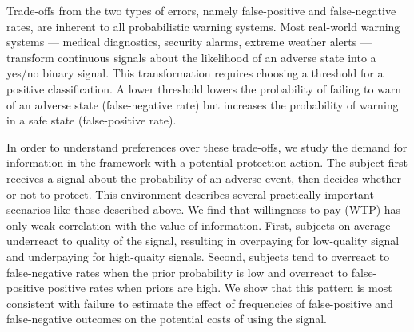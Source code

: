 \documentclass[12pt,a4paper]{article}
\begin{document}
Trade-offs from the two types of errors, namely false-positive and false-negative rates, are inherent to all probabilistic warning systems.  Most real-world warning systems --- medical diagnostics, security alarms, extreme weather alerts --- transform continuous signals about the likelihood of an adverse state into a yes/no binary signal. This transformation requires choosing a threshold for a positive classification. A lower threshold lowers the probability of failing to warn of an adverse state (false-negative rate) but increases the probability of warning in a safe state (false-positive rate). 

In order to understand preferences over these trade-offs, we study the demand for information in the framework with a potential protection action. The subject first receives a signal about the probability of an adverse event, then decides whether or not to protect. This environment describes several practically important  scenarios like those described above. We find that willingness-to-pay (WTP) has only weak correlation with the value of information. First, subjects on average underreact to quality of the signal, resulting in overpaying for low-quality signal and underpaying for high-quaity signals. Second, subjects tend to overreact to false-negative rates when the prior probability is low and overreact to false-positive positive rates when priors are high. We show that this pattern is most consistent with failure to estimate the effect of frequencies of false-positive and false-negative outcomes on the potential costs of using the signal. 

\end{document}
